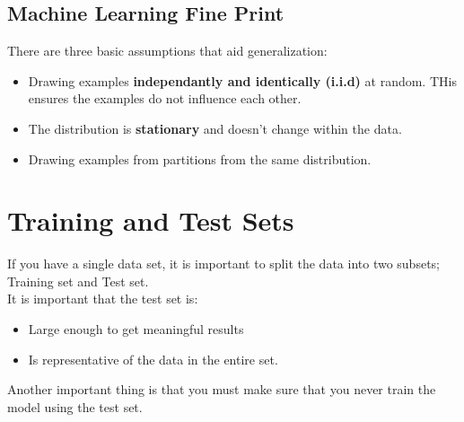 \documentclass[12pt]{article}
\begin{document}
\subsection{Machine Learning Fine Print}
There are three basic assumptions that aid generalization:
\begin{itemize}
	\item Drawing examples \textbf{independantly and identically (i.i.d)} at random. THis ensures the examples do not influence each other.
	\item The distribution is \textbf{stationary} and doesn't change within the data.
	\item Drawing examples from partitions from the same distribution.
\end{itemize}

\section{Training and Test Sets}
If you have a single data set, it is important to split the data into two subsets; Training set and Test set.
\\It is important that the test set is:
\begin{itemize}
	\item Large enough to get meaningful results
	\item Is representative of the data in the entire set.
\end{itemize}
Another important thing is that you must make sure that you never train the model using the test set.
\end{document}
